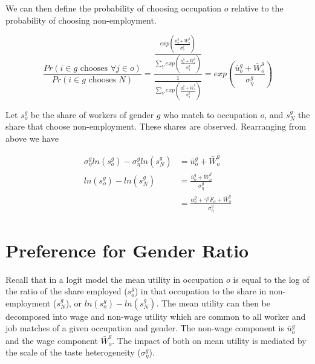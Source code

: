 \documentclass[11pt]{article}
\begin{document}

We can then define the probability of choosing occupation $o$ relative to the probability of choosing non-employment.

$$ \frac{Pr(i \in g \text{ chooses } \forall j \in o)}{ Pr(i \in g \text{ chooses }N)}= \frac{ \frac{exp(\frac{\bar{u}^{g}_o + \bar{W}^g_o}{\sigma^g_{\eta}})}{\sum_Y exp(\frac{\bar{u}^{g}_o + \bar{W}^g_o}{\sigma^g_{\eta}})}  } {\frac{1}{\sum_Y exp(\frac{\bar{u}^{g}_o + \bar{W}^g_o}{\sigma^g_{\eta}})} } = exp(\frac{\bar{u}^{g}_o + \bar{W}^g_o}{\sigma^g_{\eta}})$$

Let $s^g_o$ be the share of workers of gender $g$ who match to occupation $o$, and $s^g_N$ the share that choose non-employment. These shares are observed. Rearranging from above we have

\begin{align} \label{logit}
  \sigma^g_{\eta} ln(s^g_o) -  \sigma^g_{\eta} ln(s^g_N) &= \bar{u}^{g}_o + \bar{W}^g_o \\
     ln(s^g_o) - ln(s^g_N) &= \frac{\bar{u}^{g}_o + \bar{W}^g_o}{ \sigma^g_{\eta} } \\
     &= \frac{\alpha^{g}_o + \gamma^g F_o + \bar{W}^g_o}{ \sigma^g_{\eta} }
\end{align}




\section{Preference for Gender Ratio} \label{stage2}

Recall that in a logit model the mean utility in occupation $o$ is equal to the log of the ratio of the share employed ($s^g_o$) in that occupation to the share in non-employment ($s^g_N$), or $ ln(s^g_o) - ln(s^g_N) $. The mean utility can then be decomposed into wage and non-wage utility which are common to all worker and job matches of a given occupation and gender. The non-wage component is $\bar{u}^{g}_o$ and the wage component $\bar{W}^g_o$. The impact of both on mean utility is mediated by the scale of the taste heterogeneity ($\sigma^g_{\eta}$).
\end{document}
